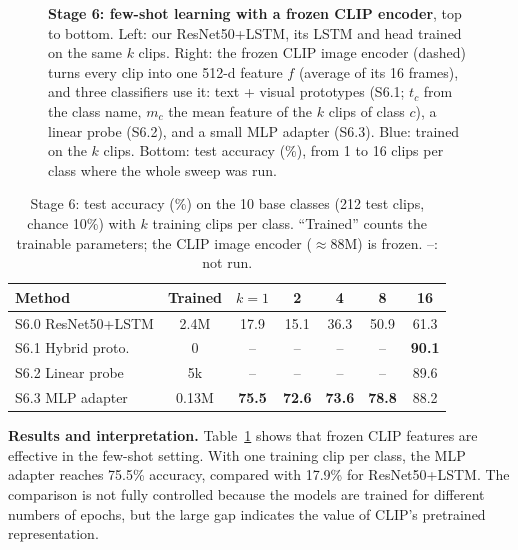 \documentclass[conference]{IEEEtran}
\begin{document}
\begin{figure}[t]
{}
\caption{\textbf{Stage 6: few-shot learning with a frozen CLIP encoder}, top to bottom. Left:
our ResNet50+LSTM, its LSTM and head trained on the same $k$ clips. Right: the frozen CLIP
image encoder (dashed) turns every clip into one 512-d feature $f$ (average of its 16
frames), and three classifiers use it: text + visual prototypes (S6.1; $t_c$ from the class
name, $m_c$ the mean feature of the $k$ clips of class $c$), a linear probe (S6.2), and a
small MLP adapter (S6.3). Blue: trained on the $k$ clips. Bottom: test accuracy (\%), from
1 to 16 clips per class where the whole sweep was run.}
\label{fig:clip}
\end{figure}

\begin{table}[t]
\centering
\caption{Stage 6: test accuracy (\%) on the 10 base classes (212 test clips, chance 10\%)
with $k$ training clips per class. ``Trained'' counts the trainable parameters; the CLIP
image encoder ($\approx$88M) is frozen. --: not run.}
\label{tab:clip}
\renewcommand{\arraystretch}{1.1}
\setlength{\tabcolsep}{3.2pt}
\begin{tabular}{lcccccc}
\toprule
Method & Trained & $k{=}1$ & 2 & 4 & 8 & 16 \\
\midrule
S6.0 ResNet50+LSTM & 2.4M  & 17.9 & 15.1 & 36.3 & 50.9 & 61.3 \\
S6.1 Hybrid proto. & 0     & --   & --   & --   & --   & \textbf{90.1} \\
S6.2 Linear probe  & 5k    & --   & --   & --   & --   & 89.6 \\
S6.3 MLP adapter   & 0.13M & \textbf{75.5} & \textbf{72.6} & \textbf{73.6} & \textbf{78.8} & 88.2 \\
\bottomrule
\end{tabular}
\end{table}

\textbf{Results and interpretation.} Table~\ref{tab:clip} shows that frozen CLIP features
are effective in the few-shot setting. With one training clip per class, the MLP
adapter reaches 75.5\% accuracy, compared with 17.9\% for ResNet50+LSTM. The comparison is
not fully controlled because the models are trained for different numbers of epochs, but
the large gap indicates the value of CLIP's pretrained representation.
\end{document}
